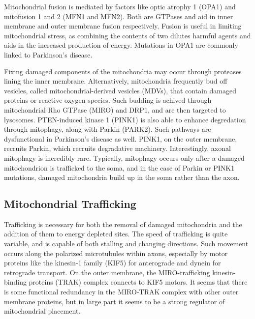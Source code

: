 \documentclass[12pt]{report}
\begin{document}
Mitochondrial fusion is mediated by factors like optic atrophy 1 (OPA1) and mitofusion 1 and 2 (MFN1 and MFN2). Both are GTPases and aid in inner membrane and outer membrane fusion respectively. Fusion is useful in limiting mitochondrial stress, as combining the contents of two dilutes harmful agents and aids in the increased production of energy. Mutations in OPA1 are commonly linked to Parkinson's disease.\newline

Fixing damaged components of the mitochondria may occur through proteases lining the inner membrane. Alternatively, mitochondria frequently bud off vesicles, called mitochondrial-derived vesicles (MDVs), that contain damaged proteins or reactive oxygen species. Such budding is achived through mitochondrial Rho GTPase (MIRO) and DRP1, and are then targeted to lysosomes. PTEN-induced kinase 1 (PINK1) is also able to enhance degredation through mitophagy, along with Parkin (PARK2). Such pathways are dysfunctional in Parkinson's disease as well. PINK1, on the outer membrane, recruits Parkin, which recruits degradative machinery. Interestingly, axonal mitophagy is incredibly rare. Typically, mitophagy occurs only after a damaged mitochondrion is trafficked to the soma, and in the case of Parkin or PINK1 mutations, damaged mitochondria build up in the soma rather than the axon. 

\subsection{Mitochondrial Trafficking}

Trafficking is necessary for both the removal of damaged mitochondria and the addition of them to energy depleted sites. The speed of trafficking is quite variable, and is capable of both stalling and changing directions. Such movement occurs along the polarized microtubules within axons, especially by motor proteins like the kinesin-1 family (KIF5) for anterograde and dynein for retrograde transport. On the outer membrane, the MIRO-trafficking kinesin-binding proteins (TRAK) complex connects to KIF5 motors. It seems that there is some functional redundancy in the MIRO-TRAK complex with other outer membrane proteins, but in large part it seems to be a strong regulator of mitochondrial placement.\newline
\end{document}
